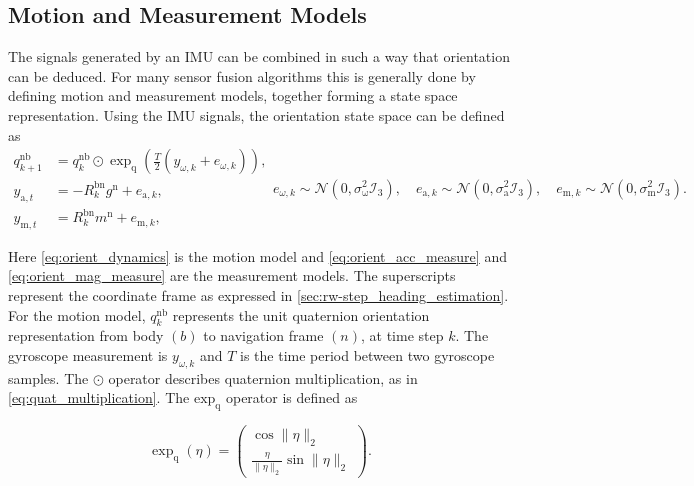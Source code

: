 \subsection{Motion and Measurement Models}
\label{sec:motion_and_measurement_models}
The signals generated by an \ac{IMU} can be combined in such a way that orientation can be deduced. For many sensor fusion algorithms this is generally done by defining motion and measurement models, together forming a state space representation. Using the \ac{IMU} signals, the orientation state space can be defined \cite{Kok2017} as 
\begin{subequations}
	\begin{align}
		\label{eq:orient_dynamics}
		q_{k+1}^{\mathrm{nb}} &=q_{k}^{\mathrm{nb}} \odot \exp _{\mathrm{q}}\left(\frac{T}{2}\left(y_{\omega, k}+e_{\omega, k}\right)\right), 	\\ 
		\label{eq:orient_acc_measure}
		y_{\mathrm{a}, t} &=-R_{k}^{\mathrm{bn}} g^{\mathrm{n}}+e_{\mathrm{a}, k},\\ 
		\label{eq:orient_mag_measure}
		y_{\mathrm{m}, t} &=R_{k}^{\mathrm{bn}} m^{\mathrm{n}}+e_{\mathrm{m}, k}, 
	\end{align}
	\begin{equation}
		\label{eq:orient_ss_noise}
		e_{\omega, k} \sim \mathcal{N}\left(0, \sigma_{\mathrm{\omega}}^{2} \mathcal{I}_{3}\right), 
		\quad 
		e_{\mathrm{a}, k} \sim \mathcal{N}\left(0, \sigma_{\mathrm{a}}^{2} \mathcal{I}_{3}\right), 
		\quad 
		e_{\mathrm{m}, k} \sim \mathcal{N}\left(0, \sigma_{\mathrm{m}}^{2} \mathcal{I}_{3}\right).
	\end{equation}
	\label{eq:orient_state_space}
\end{subequations}

Here \eqref{eq:orient_dynamics} is the motion model and \eqref{eq:orient_acc_measure} and \eqref{eq:orient_mag_measure} are the measurement models. The superscripts represent the coordinate frame as expressed in \cref{sec:rw-step_heading_estimation}.
For the motion model, $q^{\mathrm{nb}}_k$ represents the unit quaternion orientation representation from body $(b)$ to navigation frame $(n)$, at time step $ k $.  The gyroscope measurement is $y_{\omega, k}$ and $T$ is the time period between two gyroscope samples. The $\odot$ operator describes quaternion multiplication, as in \eqref{eq:quat_multiplication}. The $\text{exp}_\text{q}$ operator is defined as

\begin{equation}
	\exp_\mathrm{q} (\eta) = \left(\begin{array}{c}{\cos \|\eta\|_{2}} \\ {\frac{\eta}{\|\eta\|_{2}} \sin \|\eta\|_{2}}\end{array}\right) \label{eq:exp_q_in_text}.
\end{equation}


